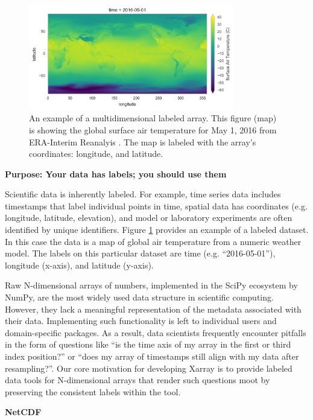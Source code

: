 \documentclass{jors}
\begin{document}
\begin{figure}[h]
	\centering
	\includegraphics[width=0.8\textwidth]{ERA-Interim_surface_air_temp_figure}
	\caption{An example of a multidimensional labeled array. This figure (map) is showing the global surface air temperature for May 1, 2016 from ERA-Interim Reanalyis \citep{Dee_2011}. The map is labeled with the array's coordinates: longitude, and latitude.}
	\label{fig:temperature_map}
\end{figure}

\textbf{Purpose: Your data has labels; you should use them}

Scientific data is inherently labeled.
For example, time series data includes timestamps that label individual points in time, spatial data has coordinates (e.g. longitude, latitude, elevation), and model or laboratory experiments are often identified by unique identifiers.
Figure \ref{fig:temperature_map} provides an example of a labeled dataset.
In this case the data is a map of global air temperature from a numeric weather model.
The labels on this particular dataset are time (e.g. ``2016-05-01''), longitude (x-axis), and latitude (y-axis).

Raw N-dimensional arrays of numbers, implemented in the SciPy ecosystem by NumPy, are the most widely used data structure in scientific computing.
However, they lack a meaningful representation of the metadata associated with their data.
Implementing such functionality is left to individual users and domain-specific packages.
As a result, data scientists frequently encounter pitfalls in the form of questions like ``is the time axis of my array in the first or third index position?'' or ``does my array of timestamps still align with my data after resampling?''.
Our core motivation for developing Xarray is to provide labeled data tools for N-dimensional arrays that render such questions moot by preserving the consistent labels within the tool.

\textbf{NetCDF}
\end{document}
